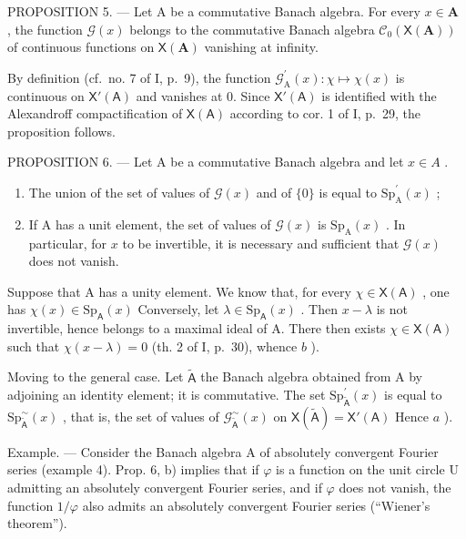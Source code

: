 PROPOSITION 5. --- Let A be a commutative Banach algebra. For every \(x \in \mathbf{A}\) , the function \(\mathcal{G}(x)\) belongs to the commutative Banach algebra \(\mathcal{C}_0(\mathsf{X}(\mathbf{A}))\) of continuous functions on \(\mathsf{X}(\mathbf{A})\) vanishing at infinity.

By definition (cf.~no. 7 of I, p.~9), the function \(\mathcal{G}_{\mathrm{A}}^{\prime}(x)\colon \chi \mapsto \chi (x)\) is continuous on \(\mathsf{X}'(\mathsf{A})\) and vanishes at 0. Since \(\mathsf{X}'(\mathsf{A})\) is identified with the Alexandroff compactification of \(\mathsf{X}(\mathsf{A})\) according to cor. 1 of I, p.~29, the proposition follows.

PROPOSITION 6. --- Let A be a commutative Banach algebra and let \(x \in A\) .

\begin{enumerate}
\def\labelenumi{\alph{enumi})}
\item
  The union of the set of values of \(\mathcal{G}(x)\) and of \(\{0\}\) is equal to \(\mathrm{Sp}_{\mathrm{A}}^{\prime}(x)\) ;
\item
  If A has a unit element, the set of values of \(\mathcal{G}(x)\) is \(\mathrm{Sp}_{\mathrm{A}}(x)\) . In particular, for \(x\) to be invertible, it is necessary and sufficient that \(\mathcal{G}(x)\) does not vanish.
\end{enumerate}

Suppose that A has a unity element. We know that, for every \(\chi \in \mathsf{X}(\mathsf{A})\) , one has \(\chi(x) \in \mathrm{Sp}_{\mathsf{A}}(x)\) Conversely, let \(\lambda \in \mathrm{Sp}_{\mathsf{A}}(x)\) . Then \(x - \lambda\) is not invertible, hence belongs to a maximal ideal of A. There then exists \(\chi \in \mathsf{X}(\mathsf{A})\) such that \(\chi(x - \lambda) = 0\) (th. 2 of I, p.~30), whence \(b\) ).

Moving to the general case. Let \(\widetilde{\mathsf{A}}\) the Banach algebra obtained from A by adjoining an identity element; it is commutative. The set \(\mathrm{Sp}_{\widetilde{\mathsf{A}}}^{\prime}(x)\) is equal to \(\mathrm{Sp}_{\widetilde{\mathsf{A}}}^{\sim}(x)\) , that is, the set of values of \(\mathcal{G}_{\widetilde{\mathsf{A}}}^{\sim}(x)\) on \(\mathsf{X}(\widetilde{\mathsf{A}}) = \mathsf{X}'(\mathsf{A})\) Hence \(a\) ).

Example. --- Consider the Banach algebra A of absolutely convergent Fourier series (example 4). Prop. 6, b) implies that if \(\varphi\) is a function on the unit circle U admitting an absolutely convergent Fourier series, and if \(\varphi\) does not vanish, the function \(1/\varphi\) also admits an absolutely convergent Fourier series (“Wiener’s theorem”).

